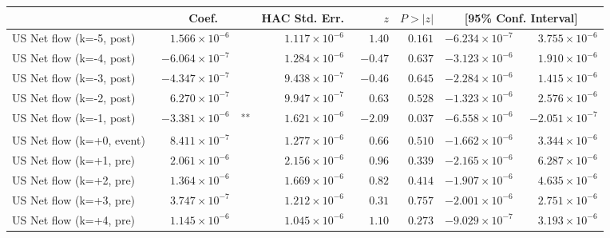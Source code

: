 \documentclass[10pt]{article}
\begin{document}
\noindent\begin{tabular}{@{}l|r@{}l rrr rr@{}}
\hline
 & \multicolumn{2}{c}{Coef.} & HAC Std. Err. & $z$ & $P>|z|$ & \multicolumn{2}{c}{[95\% Conf. Interval]} \\
\hline
US Net flow (k=-5, post) & $\phantom{-}1.566\!\times\!10^{-6}$ & \textsuperscript{} & $\phantom{-}1.117\!\times\!10^{-6}$ & $\phantom{-}1.40$ & $0.161$ & $-6.234\!\times\!10^{-7}$ & $\phantom{-}3.755\!\times\!10^{-6}$ \\
US Net flow (k=-4, post) & $-6.064\!\times\!10^{-7}$ & \textsuperscript{} & $\phantom{-}1.284\!\times\!10^{-6}$ & $-0.47$ & $0.637$ & $-3.123\!\times\!10^{-6}$ & $\phantom{-}1.910\!\times\!10^{-6}$ \\
US Net flow (k=-3, post) & $-4.347\!\times\!10^{-7}$ & \textsuperscript{} & $\phantom{-}9.438\!\times\!10^{-7}$ & $-0.46$ & $0.645$ & $-2.284\!\times\!10^{-6}$ & $\phantom{-}1.415\!\times\!10^{-6}$ \\
US Net flow (k=-2, post) & $\phantom{-}6.270\!\times\!10^{-7}$ & \textsuperscript{} & $\phantom{-}9.947\!\times\!10^{-7}$ & $\phantom{-}0.63$ & $0.528$ & $-1.323\!\times\!10^{-6}$ & $\phantom{-}2.576\!\times\!10^{-6}$ \\
US Net flow (k=-1, post) & $-3.381\!\times\!10^{-6}$ & \textsuperscript{**} & $\phantom{-}1.621\!\times\!10^{-6}$ & $-2.09$ & $0.037$ & $-6.558\!\times\!10^{-6}$ & $-2.051\!\times\!10^{-7}$ \\
US Net flow (k=+0, event) & $\phantom{-}8.411\!\times\!10^{-7}$ & \textsuperscript{} & $\phantom{-}1.277\!\times\!10^{-6}$ & $\phantom{-}0.66$ & $0.510$ & $-1.662\!\times\!10^{-6}$ & $\phantom{-}3.344\!\times\!10^{-6}$ \\
US Net flow (k=+1, pre) & $\phantom{-}2.061\!\times\!10^{-6}$ & \textsuperscript{} & $\phantom{-}2.156\!\times\!10^{-6}$ & $\phantom{-}0.96$ & $0.339$ & $-2.165\!\times\!10^{-6}$ & $\phantom{-}6.287\!\times\!10^{-6}$ \\
US Net flow (k=+2, pre) & $\phantom{-}1.364\!\times\!10^{-6}$ & \textsuperscript{} & $\phantom{-}1.669\!\times\!10^{-6}$ & $\phantom{-}0.82$ & $0.414$ & $-1.907\!\times\!10^{-6}$ & $\phantom{-}4.635\!\times\!10^{-6}$ \\
US Net flow (k=+3, pre) & $\phantom{-}3.747\!\times\!10^{-7}$ & \textsuperscript{} & $\phantom{-}1.212\!\times\!10^{-6}$ & $\phantom{-}0.31$ & $0.757$ & $-2.001\!\times\!10^{-6}$ & $\phantom{-}2.751\!\times\!10^{-6}$ \\
US Net flow (k=+4, pre) & $\phantom{-}1.145\!\times\!10^{-6}$ & \textsuperscript{} & $\phantom{-}1.045\!\times\!10^{-6}$ & $\phantom{-}1.10$ & $0.273$ & $-9.029\!\times\!10^{-7}$ & $\phantom{-}3.193\!\times\!10^{-6}$ \\

\end{tabular}
\end{document}
